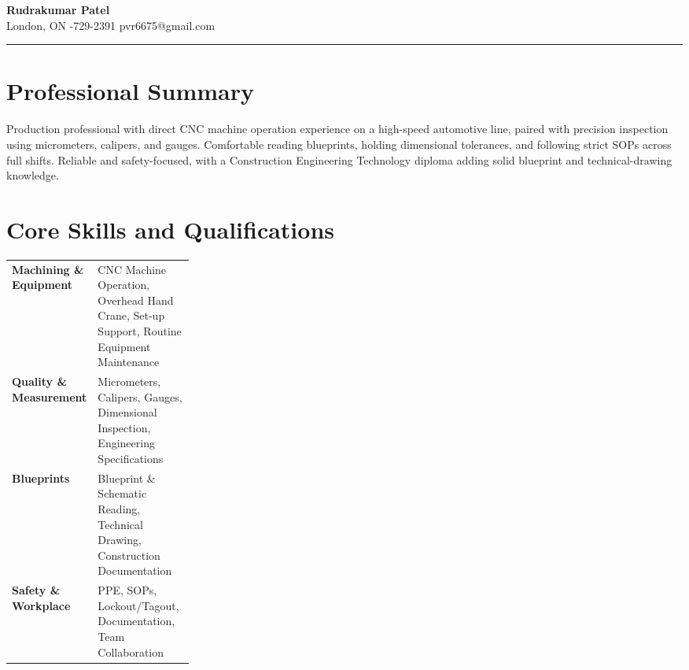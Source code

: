 \documentclass[10.5pt,letterpaper]{article}
\begin{document}
{\Large\bfseries Rudrakumar Patel}\\[2pt]
{\small\color{mid}London, ON \quad\textbar{}-729-2391 \quad\textbar\quad pvr6675@gmail.com}\par\vspace{4pt}
\rule{\linewidth}{0.6pt}\vspace{2pt}

\section{Professional Summary}
{\small\color{mid}Production professional with direct CNC machine operation experience on a high-speed automotive line, paired with precision inspection using micrometers, calipers, and gauges. Comfortable reading blueprints, holding dimensional tolerances, and following strict SOPs across full shifts. Reliable and safety-focused, with a Construction Engineering Technology diploma adding solid blueprint and technical-drawing knowledge.}

\section{Core Skills and Qualifications}
\noindent\begin{tabularx}{\linewidth}{@{}>{\bfseries}p{0.27\linewidth} X@{}}Machining \& Equipment & CNC Machine Operation, Overhead Hand Crane, Set-up Support, Routine Equipment Maintenance\\[2pt]Quality \& Measurement & Micrometers, Calipers, Gauges, Dimensional Inspection, Engineering Specifications\\[2pt]Blueprints & Blueprint \& Schematic Reading, Technical Drawing, Construction Documentation\\[2pt]Safety \& Workplace & PPE, SOPs, Lockout/Tagout, Documentation, Team Collaboration\\[2pt]\end{tabularx}
\end{document}
